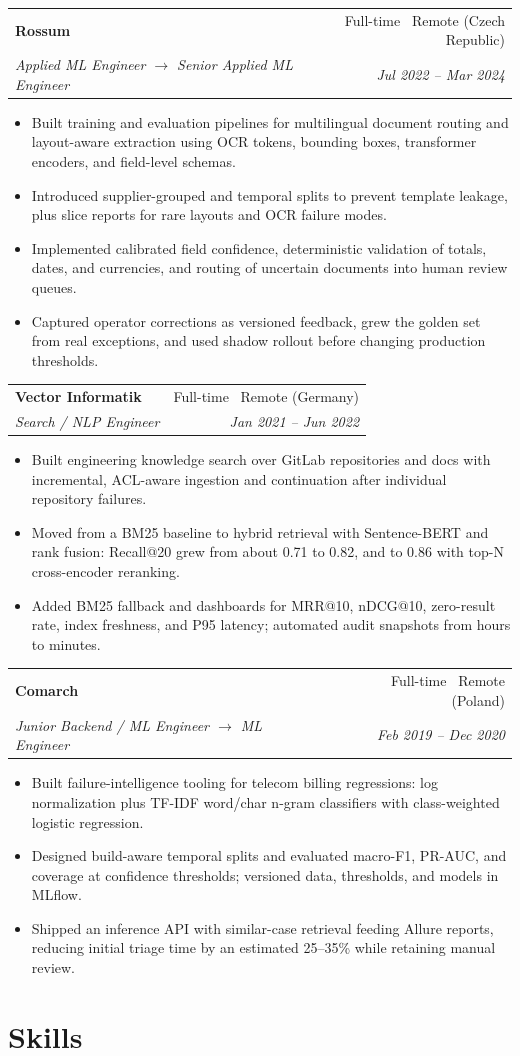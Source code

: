 \documentclass[a4paper,10pt]{article}
\makeatletter
\newcommand{\resumeSubheading}[4]{
    \vspace{-3pt}
    \begin{tabular*}{\textwidth}{l@{\extracolsep{\fill}}r}
    \textbf{#1} & #2 \\
    \textit{\small#3} & \textit{\small #4} \\
    \end{tabular*}
    \vspace{-5pt}
}
\newcommand{\resumeItemListStart}{\begin{itemize}[leftmargin=*, itemsep=0.5pt, topsep=2pt]}
\newcommand{\resumeItemListEnd}{\end{itemize}\vspace{-1pt}}
\newcommand{\resumeItem}[1]{\item \small{#1}}
\makeatother
\begin{document}
\vspace{5pt}
\resumeSubheading
{Rossum}{Full-time \textbar\ Remote (Czech Republic)}
{Applied ML Engineer $\rightarrow$ Senior Applied ML Engineer}{Jul 2022 -- Mar 2024}
\resumeItemListStart
\resumeItem{Built training and evaluation pipelines for multilingual document routing and layout-aware extraction using OCR tokens, bounding boxes, transformer encoders, and field-level schemas.}
\resumeItem{Introduced supplier-grouped and temporal splits to prevent template leakage, plus slice reports for rare layouts and OCR failure modes.}
\resumeItem{Implemented calibrated field confidence, deterministic validation of totals, dates, and currencies, and routing of uncertain documents into human review queues.}
\resumeItem{Captured operator corrections as versioned feedback, grew the golden set from real exceptions, and used shadow rollout before changing production thresholds.}
\resumeItemListEnd

\vspace{5pt}
\resumeSubheading
{Vector Informatik}{Full-time \textbar\ Remote (Germany)}
{Search / NLP Engineer}{Jan 2021 -- Jun 2022}
\resumeItemListStart
\resumeItem{Built engineering knowledge search over GitLab repositories and docs with incremental, ACL-aware ingestion and continuation after individual repository failures.}
\resumeItem{Moved from a BM25 baseline to hybrid retrieval with Sentence-BERT and rank fusion: Recall@20 grew from about 0.71 to 0.82, and to 0.86 with top-N cross-encoder reranking.}
\resumeItem{Added BM25 fallback and dashboards for MRR@10, nDCG@10, zero-result rate, index freshness, and P95 latency; automated audit snapshots from hours to minutes.}
\resumeItemListEnd

\vspace{5pt}
\resumeSubheading
{Comarch}{Full-time \textbar\ Remote (Poland)}
{Junior Backend / ML Engineer $\rightarrow$ ML Engineer}{Feb 2019 -- Dec 2020}
\resumeItemListStart
\resumeItem{Built failure-intelligence tooling for telecom billing regressions: log normalization plus TF-IDF word/char n-gram classifiers with class-weighted logistic regression.}
\resumeItem{Designed build-aware temporal splits and evaluated macro-F1, PR-AUC, and coverage at confidence thresholds; versioned data, thresholds, and models in MLflow.}
\resumeItem{Shipped an inference API with similar-case retrieval feeding Allure reports, reducing initial triage time by an estimated 25--35\% while retaining manual review.}
\resumeItemListEnd

\section{Skills}
\end{document}
